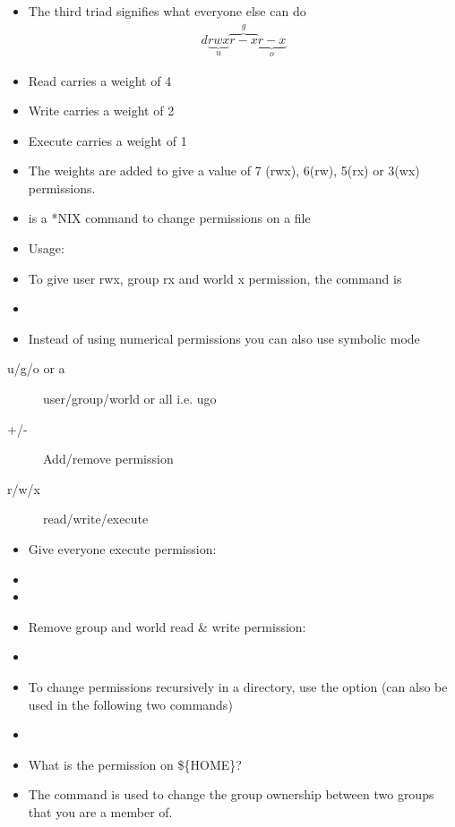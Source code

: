 \documentclass[10pt,t]{beamer}
\begin{document}
\begin{frame}
\begin{itemize}
    \item The third triad signifies what everyone else can do
      \begin{gather*}
        d\underbrace{rwx}_{u}\overbrace{r-x}^g\underbrace{r-x}_o
      \end{gather*}
    \item Read carries a weight of 4
    \item Write carries a weight of 2
    \item Execute carries a weight of 1
    \item The weights are added to give a value of 7 (rwx), 6(rw), 5(rx) or 3(wx) permissions. 
    \item {} is a *NIX command to change permissions on a file
    \item[] Usage: 
    \item To give user rwx, group rx and world x permission, the command is
    \item[] 
    \framebreak
    \item Instead of using numerical permissions you can also use symbolic mode
  \end{itemize}
  \begin{description}
    \item[u/g/o or a] user/group/world or all i.e. ugo
    \item[+/-] Add/remove permission
    \item[r/w/x] read/write/execute
  \end{description}
  \begin{itemize}
    \item Give everyone execute permission: 
    \item[] 
    \item[] 
    \item Remove group and world read \& write permission: 
    \item[] 
    \item To change permissions recursively in a directory, use the option  (can also be used in the following two commands)
    \item[] 
    \item[] What is the permission on \$\{HOME\}?
    \framebreak
    \item The  command is used to change the group ownership between two groups that you are a member of.

\end{itemize}
\end{frame}
\end{document}
